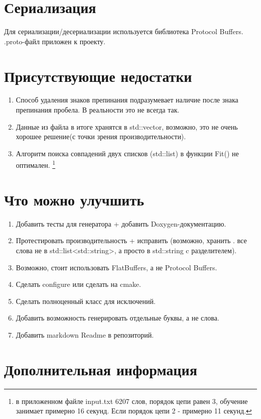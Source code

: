 \documentclass[a4paper]{article}
\begin{document}
\section{Сериализация}
Для сериализации/десериализации используется библиотека Protocol Buffers.\\
.proto-файл приложен к проекту.


\section{Присутствующие недостатки}
\begin{enumerate}
	\item Способ удаления знаков препинания подразумевает наличие после знака препинания пробела. В реальности это не всегда так.
	\item Данные из файла в итоге хранятся в std::vector, возможно, это не очень хорошее решение(с точки зрения производительности).
	\item Алгоритм поиска совпадений двух списков (std::list) в функции Fit() не оптимален.
	 \footnote {в приложенном файле input.txt 6207 слов, порядок цепи равен 3, обучение занимает примерно 16 секунд. Если порядок цепи 2 - примерно 11 секунд.}
\end{enumerate}

\section{Что можно улучшить}
\begin{enumerate}
	\item Добавить тесты для генератора + добавить Doxygen-документацию.
	\item Протестировать производительность + исправить (возможно, хранить .
		все слова не в std::list<std::string>, а просто в std::string c разделителем).
	\item Возможно, стоит использовать FlatBuffers, а не Protocol Buffers.
	\item Сделать configure или сделать на cmake.
	\item Сделать полноценный класс для исключений.
	\item Добавить возможность генерировать отдельные буквы, а не слова.
	\item Добавить markdown Readme в репозиторий.

\end{enumerate}
\section{Дополнительная информация}
\end{document}
